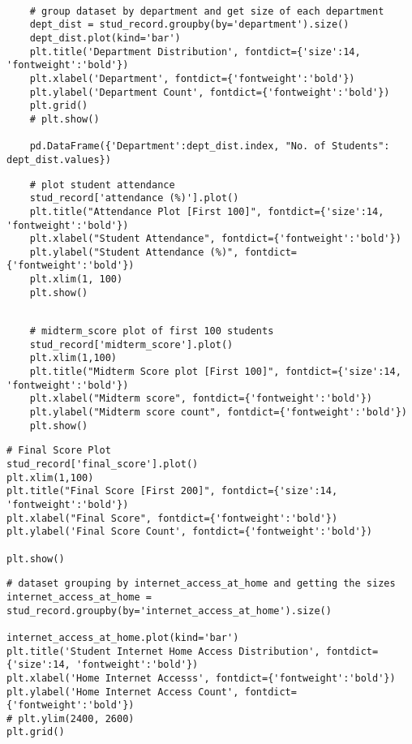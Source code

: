 \label{code:student_department}
\begin{verbatim}
	
	# group dataset by department and get size of each department
	dept_dist = stud_record.groupby(by='department').size()
	dept_dist.plot(kind='bar')
	plt.title('Department Distribution', fontdict={'size':14, 'fontweight':'bold'})
	plt.xlabel('Department', fontdict={'fontweight':'bold'})
	plt.ylabel('Department Count', fontdict={'fontweight':'bold'})
	plt.grid()
	# plt.show()
	
	pd.DataFrame({'Department':dept_dist.index, "No. of Students": dept_dist.values})
\end{verbatim}


\label{code:dataset_head}
\begin{verbatim}
	# plot student attendance
	stud_record['attendance (%)'].plot()
	plt.title("Attendance Plot [First 100]", fontdict={'size':14, 'fontweight':'bold'})
	plt.xlabel("Student Attendance", fontdict={'fontweight':'bold'})
	plt.ylabel("Student Attendance (%)", fontdict={'fontweight':'bold'})
	plt.xlim(1, 100)
	plt.show()
\end{verbatim}


\label{code:midterm_score}
\begin{verbatim}
	
	# midterm_score plot of first 100 students
	stud_record['midterm_score'].plot()
	plt.xlim(1,100)
	plt.title("Midterm Score plot [First 100]", fontdict={'size':14, 'fontweight':'bold'})
	plt.xlabel("Midterm score", fontdict={'fontweight':'bold'})
	plt.ylabel("Midterm score count", fontdict={'fontweight':'bold'})
	plt.show()
\end{verbatim}

\label{code:final_score}
\begin{verbatim}
# Final Score Plot
stud_record['final_score'].plot()
plt.xlim(1,100)
plt.title("Final Score [First 200]", fontdict={'size':14, 'fontweight':'bold'})
plt.xlabel("Final Score", fontdict={'fontweight':'bold'})
plt.ylabel('Final Score Count', fontdict={'fontweight':'bold'})

plt.show()
\end{verbatim}

\label{code:internet_access}
\begin{verbatim}
# dataset grouping by internet_access_at_home and getting the sizes
internet_access_at_home = stud_record.groupby(by='internet_access_at_home').size()

internet_access_at_home.plot(kind='bar')
plt.title('Student Internet Home Access Distribution', fontdict={'size':14, 'fontweight':'bold'})
plt.xlabel('Home Internet Accesss', fontdict={'fontweight':'bold'})
plt.ylabel('Home Internet Access Count', fontdict={'fontweight':'bold'})
# plt.ylim(2400, 2600)
plt.grid()
\end{verbatim}


